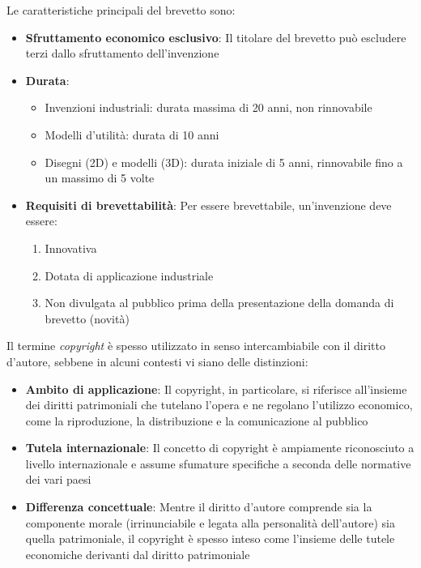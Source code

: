 \documentclass[10pt,oneside,a4paper]{article}
\begin{document}
	Le caratteristiche principali del brevetto sono:
	\begin{itemize}
		\item \textbf{Sfruttamento economico esclusivo}: Il titolare del brevetto può escludere terzi dallo sfruttamento dell'invenzione
		\item \textbf{Durata}:
		\begin{itemize}
			\item Invenzioni industriali: durata massima di 20 anni, non rinnovabile
			\item Modelli d'utilità: durata di 10 anni
			\item Disegni (2D) e modelli (3D): durata iniziale di 5 anni, rinnovabile fino a un massimo di 5 volte
		\end{itemize}
		\item \textbf{Requisiti di brevettabilità}:  
		Per essere brevettabile, un'invenzione deve essere:
		\begin{enumerate}
			\item Innovativa
			\item Dotata di applicazione industriale
			\item Non divulgata al pubblico prima della presentazione della domanda di brevetto (novità)
		\end{enumerate}
	\end{itemize}
	Il termine \textit{copyright} è spesso utilizzato in senso intercambiabile con il diritto d'autore, sebbene in alcuni contesti vi siano delle distinzioni:
	\begin{itemize}
		\item \textbf{Ambito di applicazione}:  
		Il copyright, in particolare, si riferisce all'insieme dei diritti patrimoniali che tutelano l'opera e ne regolano l'utilizzo economico, come la riproduzione, la distribuzione e la comunicazione al pubblico
		\item \textbf{Tutela internazionale}:  
		Il concetto di copyright è ampiamente riconosciuto a livello internazionale e assume sfumature specifiche a seconda delle normative dei vari paesi
		\item \textbf{Differenza concettuale}:  
		Mentre il diritto d'autore comprende sia la componente morale (irrinunciabile e legata alla personalità dell'autore) sia quella patrimoniale, il copyright è spesso inteso come l'insieme delle tutele economiche derivanti dal diritto patrimoniale
	\end{itemize}
\end{document}
